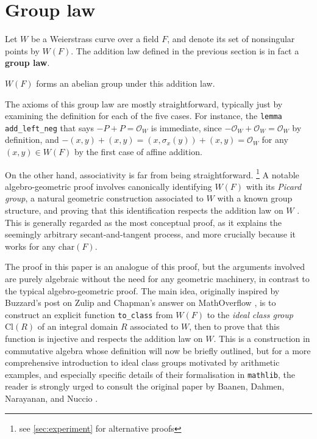 \documentclass[a4paper,UKenglish,cleveref,autoref,thm-restate]{lipics-v2021}
\begin{document}
\pagebreak

\section{Group law}
\label{sec:group}

Let $ W $ be a Weierstrass curve over a field $ F $, and denote its set of nonsingular points by $ W(F) $. The addition law defined in the previous section is in fact a \textbf{group law}.

\begin{proposition}
\label{prop:group}
$ W(F) $ forms an abelian group under this addition law.
\end{proposition}

The axioms of this group law are mostly straightforward, typically just by examining the definition for each of the five cases. For instance, the \texttt{lemma add\_left\_neg} that says $ -P + P = \mathcal{O}_W $ is immediate, since $ -\mathcal{O}_W + \mathcal{O}_W = \mathcal{O}_W $ by definition, and $ -(x, y) + (x, y) = (x, \sigma_x(y)) + (x, y) = \mathcal{O}_W $ for any $ (x, y) \in W(F) $ by the first case of affine addition.

On the other hand, associativity is far from being straightforward. \footnote{see \cref{sec:experiment} for alternative proofs} A notable algebro-geometric proof involves canonically identifying $ W(F) $ with its \emph{Picard group}, a natural geometric construction associated to $ W $ with a known group structure, and proving that this identification respects the addition law on $ W $ \cite[Proposition III.3.4]{silverman}. This is generally regarded as the most conceptual proof, as it explains the seemingly arbitrary secant-and-tangent process, and more crucially because it works for any $ \mathrm{char}(F) $.

The proof in this paper is an analogue of this proof, but the arguments involved are purely algebraic without the need for any geometric machinery, in contrast to the typical algebro-geometric proof. The main idea, originally inspired by Buzzard's post on Zulip \cite{buzzard} and Chapman's answer on MathOverflow \cite{chapman}, is to construct an explicit function \texttt{to\_class} from $ W(F) $ to the \emph{ideal class group} $ \mathrm{Cl}(R) $ of an integral domain $ R $ associated to $ W $, then to prove that this function is injective and respects the addition law on $ W $. This is a construction in commutative algebra whose definition will now be briefly outlined, but for a more comprehensive introduction to ideal class groups motivated by arithmetic examples, and especially specific details of their formalisation in \texttt{mathlib}, the reader is strongly urged to consult the original paper by Baanen, Dahmen, Narayanan, and Nuccio \cite[Section 2]{baanen}.
\end{document}
